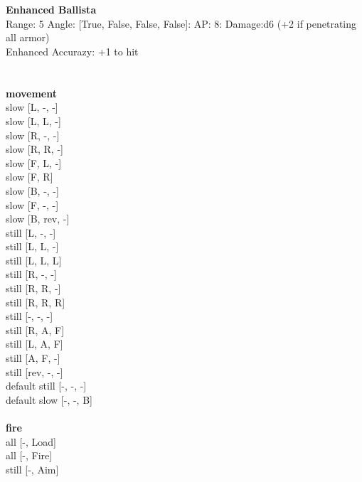 \ \\

\ \\
{\bf Enhanced Ballista } \\



Range: 5  Angle: [True, False, False, False]: AP: 8: Damage:d6 (+2 if penetrating all armor) \\
Enhanced Accurazy: +1 to hit\\ 




 
\ \\



\ \\ {\bf movement } \\
slow [L, -, -] \\
slow [L, L, -] \\
slow [R, -, -] \\
slow [R, R, -] \\
slow [F, L, -] \\
slow [F, R] \\
slow [B, -, -] \\
slow [F, -, -] \\
slow [B, rev, -] \\
still [L, -, -] \\
still [L, L, -] \\
still [L, L, L] \\
still [R, -, -] \\
still [R, R, -] \\
still [R, R, R] \\
still [-, -, -] \\
still [R, A, F] \\
still [L, A, F] \\
still [A, F, -] \\
still [rev, -, -] \\
default still [-, -, -] \\
default slow [-, -, B] \\
\ \\ {\bf fire } \\
all [-, Load] \\
all [-, Fire] \\
still [-, Aim] \\



